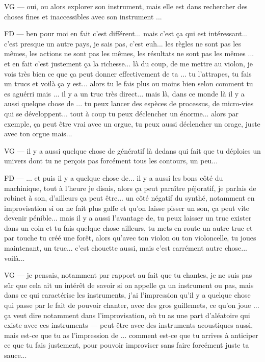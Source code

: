 VG — oui, ou alors explorer son instrument, mais elle est dans rechercher des choses fines et inaccessibles avec son instrument ... 

FD — ben pour moi en fait c'est différent... mais c'est ça qui est intéressant... c'est presque un autre pays, je sais pas, c'est euh... les règles ne sont pas les mêmes, les actions ne sont pas les mêmes, les résultats ne sont pas les mêmes ... et en fait c'est justement ça la richesse... là du coup, de me mettre au violon, je vois très bien ce que ça peut donner effectivement de ta ... tu l'attrapes, tu fais un trucs et voilà ça y est... alors tu le fais plus ou moins bien selon comment tu es aguérri mais ... il y a un truc très direct... mais là, dans ce monde là il y a aussi quelque chose de ... tu peux lancer des espèces de processus, de micro-vies qui se développent... tout à coup tu peux déclencher un énorme... alors par exemple, ça peut être vrai avec un orgue, tu peux aussi déclencher un orage, juste avec ton orgue mais... 

VG — il y a aussi quelque chose de génératif là dedans qui fait que tu déploies un univers dont tu ne perçois pas forcément tous les contours, un peu... 

FD — ... et puis il y a quelque chose de... il y a aussi les bons côté du machinique, tout à l'heure je disais, alors ça peut paraître péjoratif, je parlais de robinet à son, d'ailleurs ça peut être... un côté négatif du synthé, notamment en improvisation si on ne fait plus gaffe et qu'on laisse pisser un son, ça peut vite devenir pénible... mais il y a aussi l'avantage de,  tu peux laisser un truc exister dans un coin et tu fais quelque chose ailleurs, tu mets en route un autre truc et par touche tu créé une forêt, alors qu'avec ton violon ou ton violoncelle, tu joues maintenant, un truc... c'est chouette aussi, mais c'est carrément autre chose... voilà... 

VG — je pensais, notamment par rapport au fait que tu chantes, je ne suis pas sûr que cela ait un intérêt de savoir si on appelle ça un instrument ou pas, mais dans ce qui caractérise les instruments, j'ai l'impression qu'il y a quelque chose qui passe par le fait de pouvoir chanter, avec des gros guillemets, ce qu'on joue ... ça veut dire notamment dans l'improvisation, où tu as une part d'aléatoire qui existe avec ces instruments — peut-être avec des instruments acoustiques aussi, mais est-ce que tu as l'impression de ... comment est-ce que tu arrives à anticiper ce que tu fais justement, pour pouvoir improviser sans faire forcément juste ta sauce... 

